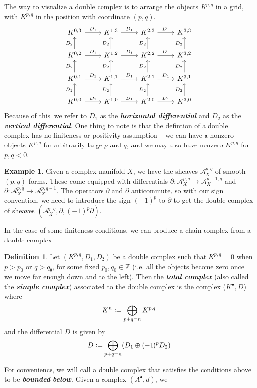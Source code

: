 \documentclass[psamsfonts, 12pt]{amsart}
\theoremstyle{definition}
\newtheorem{defn}[thm]{Definition}
\newtheorem{exmp}[thm]{Example}
\theoremstyle{remark}
\newcommand{\ib}[1]{\textbf{\textit{#1}}}
\newcommand{\Z}{\mathbb{Z}}
\newcommand{\dbar}{\overline{\partial}}
\newcommand{\defeq}{\vcentcolon=}
\begin{document}
The way to visualize a double complex is to arrange the objects $K^{p,q}$ in a
grid, with $K^{p,q}$ in the position with coordinate $(p,q)$.
\[\begin{tikzcd}
K^{0,3} \ar[r, "D_1"] & K^{1,3} \ar[r, "D_1"] & K^{2,3} \ar[r, "D_1"] & K^{3,3} \\
K^{0,2} \ar[u, "D_2"] \ar[r, "D_1"] & K^{1,2} \ar[u, "D_2"] \ar[r, "D_1"]
& K^{2,2} \ar[u, "D_2"] \ar[r, "D_1"] & K^{3,2} \ar[u, "D_2"] \\
K^{0,1} \ar[u, "D_2"] \ar[r, "D_1"] & K^{1,1} \ar[u, "D_2"] \ar[r, "D_1"]
& K^{2,1} \ar[u, "D_2"] \ar[r, "D_1"] & K^{3,1} \ar[u, "D_2"] \\
K^{0,0} \ar[u, "D_2"] \ar[r, "D_1"] & K^{1,0} \ar[u, "D_2"] \ar[r, "D_1"]
& K^{2,0} \ar[u, "D_2"] \ar[r, "D_1"] & K^{3,0} \ar[u, "D_2"]
\end{tikzcd}\]
Because of this, we refer to $D_1$ as the \ib{horizontal differential} and
$D_2$ as the \ib{vertical differential}. One thing to note is that the defintion
of a double complex has no finiteness or positivity assumption -- we can
have a nonzero objects $K^{p,q}$ for arbitrarily large $p$ and $q$, and we may also
have nonzero $K^{p,q}$ for $p,q < 0$.
%
\begin{exmp}
Given a complex manifold $X$, we have the sheaves $\mathcal{A}^{p,q}_X$
of smooth $(p,q)$-forms. These come equipped with differentials
$\partial : \mathcal{A}^{p,q}_X \to \mathcal{A}^{p+1,q}_X$ and
$\dbar : \mathcal{A}^{p,q}_X \to \mathcal{A}^{p,q+1}_X$. The operators $\partial$
and $\dbar$ anticommute, so with our sign convention, we need to introduce
the sign $(-1)^p$ to $\dbar$ to get the double complex of sheaves
$(\mathcal{A}^{p,q}_X, \partial, (-1)^p\dbar)$.
\end{exmp}
%
In the case of some finiteness conditions, we can produce a chain complex from
a double complex.
%
\begin{defn}
Let $(K^{p,q},D_1,D_2)$ be a double complex such that $K^{p,q} = 0$ when
$p > p_0$ or $q > q_0$, for some fixed $p_0,q_0 \in \Z$ (i.e. all the objects
become zero once we move far enough down and to the left). Then the
\ib{total complex} (also called the \ib{simple complex}) associated to the double
complex is the complex ($K^\bullet, D$) where
\[
K^n \defeq \bigoplus_{p+q=n}K^{p,q}
\]
and the differential $D$ is given by
\[
D \defeq \bigoplus_{p+q=n}(D_1 \oplus (-1)^pD_2)
\]
\end{defn}
%
For convenience, we will call a double complex that satisfies the
conditions above to be \ib{bounded below}. Given a complex $(A^\bullet, d)$, we
\end{document}
